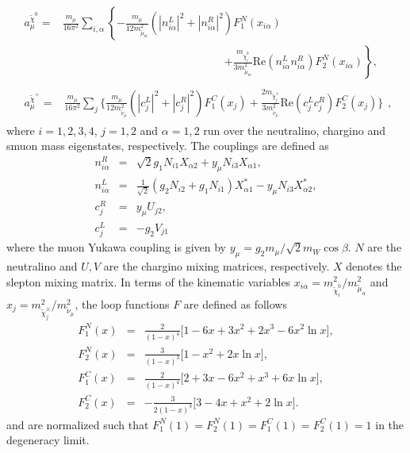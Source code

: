 \begin{enumerate}
\begin{align}
\begin{split}\label{eqn:amu0}
    a_{\mu}^{\widetilde\chi^0}={}& \frac{m_{\mu}}{16\pi^2}\sum_{i,\alpha}\left\{-\frac{m_{\mu}}{12 m^2_{\widetilde\mu_m}}(|n^L_{i\alpha}|^2+|n^R_{i\alpha}|^2)F_1^N(x_{i\alpha}) \right. \\
          &\hspace{175pt} \left. +\frac{m_{\widetilde\chi_i^0}}{3m^2_{\widetilde\mu_m}}\text{Re}(n^L_{i\alpha}n^R_{i\alpha})F_2^N(x_{i\alpha})\right\},
\end{split}\\
\begin{split}\label{eqn:amupm}
a_{\mu}^{\widetilde\chi^+}={}& \frac{m_{\mu}}{16\pi^2}\sum_{j}\Big\{\frac{m_{\mu}}{12 m^2_{\widetilde\nu_{\mu}}}(|c_j^L|^2+|c_j^R|^2)F_1^C(x_j)
+\frac{2m_{\widetilde\chi_j^{\pm}}}{3m^2_{\widetilde\nu_{\mu}}}\text{Re}(c_j^Lc_j^R)F_2^C(x_j)\Big\} 
\end{split},
\end{align}
where $i=1,2,3,4$, $j=1,2$ and $\alpha=1,2$ run over the neutralino, chargino and smuon mass eigenstates, respectively. The couplings are defined as
\begin{eqnarray}
n^R_{i\alpha}&=& \sqrt{2}g_1 N_{i1}X_{\alpha2}+y_{\mu}N_{i3}X_{\alpha1}, \nonumber \\
n^L_{i\alpha}&=& \frac{1}{\sqrt{2}}(g_2 N_{i2}+g_1 N_{i1})X^*_{\alpha1}-y_{\mu}N_{i3}X^*_{\alpha2}, \nonumber \\
c^R_j&=& y_{\mu}U_{j2}, \nonumber \\
c^L_j&=&-g_2 V_{j1}
\end{eqnarray}
where the muon Yukawa coupling is given by $y_{\mu}=g_2 m_{\mu}/\sqrt{2} m_W \cos\beta$. $N$ are the neutralino and $U,V$ are the chargino mixing matrices, respectively. $X$ denotes the slepton mixing matrix. In terms of the kinematic variables $x_{i\alpha}=m^2_{\widetilde\chi_i^0}/m^2_{\widetilde\mu_\alpha}$ and $x_j=m^2_{\widetilde\chi_j^{\pm}}/m^2_{\widetilde\nu_{\mu}}$, the loop functions $F$ are defined as follows
\begin{eqnarray}
F_1^N(x)&=&\frac{2}{(1-x)^4}\Big[1-6x+3x^2+2x^3-6x^2 \ln x\Big], \nonumber \\
F_2^N(x) &=&\frac{3}{(1-x)^3}\Big[1-x^2+2x\ln x\Big],\nonumber \\
F_1^C(x)&=&\frac{2}{(1-x)^4}\Big[2+3x-6x^2+x^3+6x\ln x\Big],\nonumber \\
F_2^C(x)&=&-\frac{3}{2(1-x)^3}\Big[3-4x+x^2+2\ln x\Big].
\end{eqnarray}
and are normalized such that $F_1^N(1)=F_2^N(1)=F_1^C(1)=F_2^C(1)=1$ in the degeneracy limit. 


\end{enumerate}
